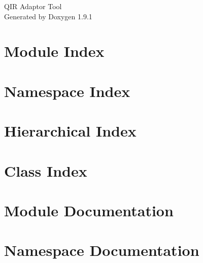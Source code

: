 \let\mypdfximage\pdfximage\def\pdfximage{\immediate\mypdfximage}\documentclass[twoside]{book}
\newcommand{\+}{\discretionary{\mbox{\scriptsize$\hookleftarrow$}}{}{}}
\newcommand{\clearemptydoublepage}{%
  \newpage{\pagestyle{empty}\cleardoublepage}%
}
\begin{document}
\raggedbottom

\hypersetup{pageanchor=false,
             bookmarksnumbered=true,
             pdfencoding=unicode
            }
\begin{titlepage}
\vspace*{7cm}
\begin{center}%
{\Large QIR Adaptor Tool }\\
\vspace*{1cm}
{\large Generated by Doxygen 1.9.1}\\
\end{center}
\end{titlepage}
\clearemptydoublepage
{}
\tableofcontents
\clearemptydoublepage
{}
\hypersetup{pageanchor=true}

\chapter{Module Index}

\chapter{Namespace Index}

\chapter{Hierarchical Index}

\chapter{Class Index}

\chapter{Module Documentation}

\chapter{Namespace Documentation}

\end{document}
